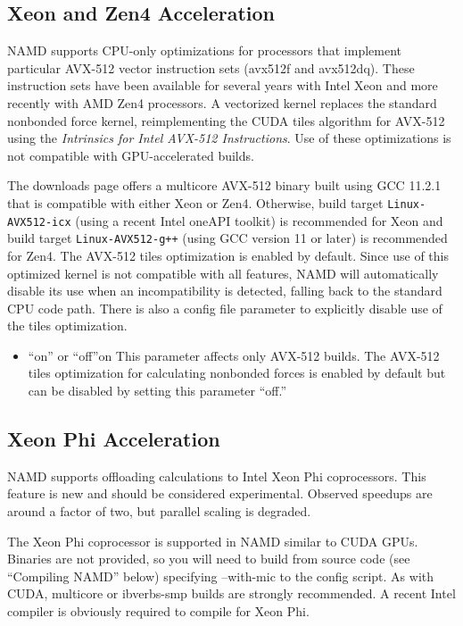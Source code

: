 \subsection{Xeon and Zen4 Acceleration}

NAMD supports CPU-only optimizations for processors that implement
particular AVX-512 vector instruction sets (avx512f and avx512dq).
These instruction sets have been available for several years with
Intel Xeon and more recently with AMD Zen4 processors.
A vectorized kernel replaces the standard nonbonded force kernel,
reimplementing the CUDA tiles algorithm for AVX-512 using the
\emph{Intrinsics for Intel AVX-512 Instructions}.
Use of these optimizations is not compatible with GPU-accelerated builds.

The downloads page offers a multicore AVX-512 binary built
using GCC 11.2.1 that is compatible with either Xeon or Zen4.
Otherwise, build target \texttt{Linux-AVX512-icx}
(using a recent Intel oneAPI toolkit) is recommended for Xeon
and build target \texttt{Linux-AVX512-g++}
(using GCC version 11 or later) is recommended for Zen4.
The AVX-512 tiles optimization is enabled by default.
Since use of this optimized kernel is not compatible with
all features, NAMD will automatically disable its use
when an incompatibility is detected,
falling back to the standard CPU code path.
There is also a config file parameter to explicitly disable
use of the tiles optimization.
\begin{itemize}
\item
{}%
{``on'' or ``off''}{on}{%
This parameter affects only AVX-512 builds.
The AVX-512 tiles optimization for calculating nonbonded forces
is enabled by default but can be disabled by setting this
parameter ``off.''
}
\end{itemize}


\subsection{Xeon Phi Acceleration}

NAMD supports offloading calculations to Intel Xeon Phi coprocessors.
This feature is new and should be considered experimental.  Observed
speedups are around a factor of two, but parallel scaling is degraded.

The Xeon Phi coprocessor is supported in NAMD similar to CUDA GPUs.
Binaries are not provided, so you will need to build from source code
(see ``Compiling NAMD'' below) specifying --with-mic to the config script.
As with CUDA, multicore or ibverbs-smp builds are strongly recommended.
A recent Intel compiler is obviously required to compile for Xeon Phi.

